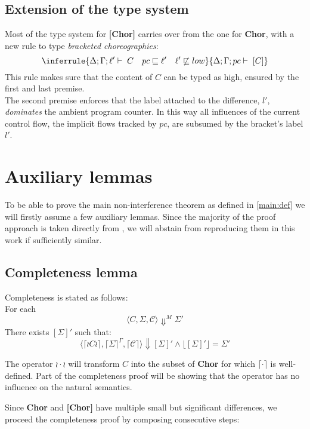\documentclass[12pt,a4paper,twoside]{book}
\begin{document}
\subsection{Extension of the type system}
Most of the type system for \textbf{[Chor]} carries over from the one for \textbf{Chor}, with a new rule to type \emph{bracketed choreographies}:
$$
  \inferrule
  {\Delta;\Gamma;\ell' \vdash \; C  \quad pc \sqsubseteq \ell' \quad \ell' \not\sqsubseteq low}
  {\Delta;\Gamma;pc \vdash \; [C]}
$$
This rule makes sure that the content of $C$ can be typed as high, ensured by the first and last premise.\\
The second premise enforces that the label attached to the difference, \(l'\), \emph{dominates} the ambient program counter. In this way all influences of the current control flow, the implicit flows tracked by \(pc\), are subsumed by the bracket’s label \(l'\).

\section{Auxiliary lemmas}
To be able to prove the main non-interference theorem as defined in \ref{main:def} we will firstly assume a few auxiliary lemmas. Since the majority of the proof approach is taken directly from \cite{myers2011proving}, we will abstain from reproducing them in this work if sufficiently similar.

\subsection{Completeness lemma}\label{chap:compl}
Completeness is stated as follows:\\
For each
$$
\langle C, \Sigma, \mathscr{C} \rangle \Downarrow^M \Sigma'
$$
There exists $[\Sigma]'$ such that:
\begin{equation}
\label{aux:compl}
	\langle \lceil \wr C \wr \rceil, \lceil \Sigma \rceil^\Gamma, \lceil \mathscr{C} \rceil \rangle \Downarrow [\Sigma]'
\land \lfloor [\Sigma]' \rfloor = \Sigma'
\end{equation}

The operator $\wr \cdot \wr$ will transform $C$ into the subset of \textbf{Chor} for which
$\lceil \cdot \rceil$ is well-defined. Part of the completeness proof will be showing that the operator has no influence on the natural semantics.

Since \textbf{Chor} and \textbf{[Chor]} have multiple small but significant differences, we proceed the completeness proof by composing consecutive steps:
\end{document}
